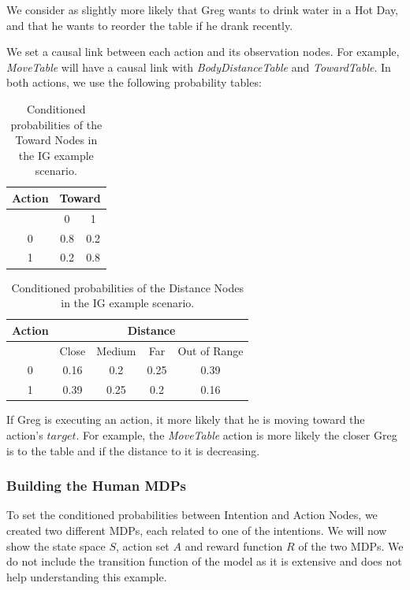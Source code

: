 We consider as slightly more likely that Greg wants to drink water in a Hot Day, and that he wants to reorder the table if he drank recently.

We set a causal link between each action and its observation nodes. For example, \textit{MoveTable} will have a causal link with \textit{BodyDistanceTable} and \textit{TowardTable}. In both actions, we use the following probability tables:

 \begin{table}[h!]
\centering
\begin{tabular}{|c|c|c|}
\hline
Action & \multicolumn{2}{|c|}{Toward} \\ \hline \hline
& 0 & 1 \\ \hline
0  & 0.8 & 0.2 \\ \hline
1 & 0.2 & 0.8 \\  \hline
\end{tabular}
\caption[Belief models in the IG scenario]{Conditioned probabilities of the Toward Nodes in the IG example scenario.}
 \label{table:situation_assessment-ig_toward}    
\end{table}

 \begin{table}[h!]
\centering
\begin{tabular}{|c|c|c|c|c|}
\hline
Action & \multicolumn{4}{|c|}{Distance} \\ \hline \hline
& Close & Medium & Far & Out of Range \\ \hline
0  & 0.16 & 0.2 & 0.25 & 0.39 \\ \hline
1 & 0.39 & 0.25 & 0.2 & 0.16 \\ \hline
\end{tabular}
\caption[Belief models in the IG scenario]{Conditioned probabilities of the Distance Nodes in the IG example scenario.}
 \label{table:situation_assessment-ig_distance}    
\end{table}

If Greg is executing an action, it  more likely that he is moving toward the action's $target$. For example, the \textit{MoveTable} action is more likely the closer Greg is to the table and if the distance to it is decreasing.

\subsubsection{Building the Human MDPs}

To set the conditioned probabilities between Intention and Action Nodes, we created two different MDPs, each related to one of the intentions. We will now show the state space $S$, action set $A$ and reward function $R$  of the two MDPs. We do not include the transition function of the model as it is extensive and does not help understanding this example.

